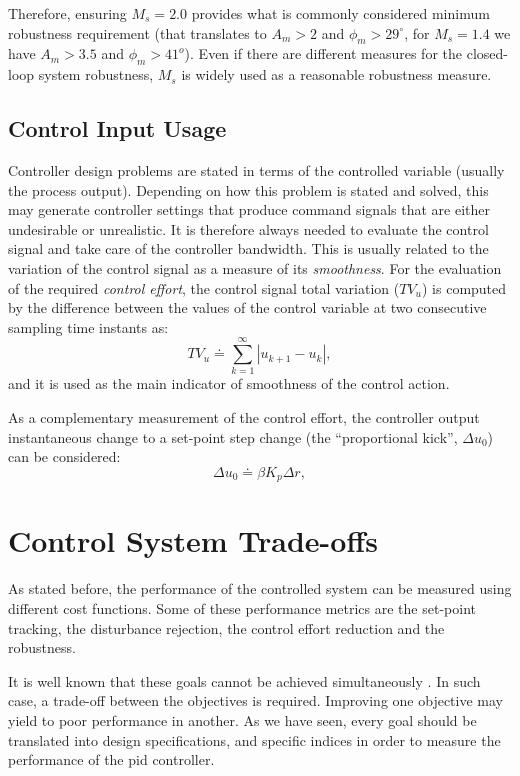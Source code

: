Therefore, ensuring $M_s=2.0$ provides what is commonly considered minimum robustness requirement (that translates to $A_m> 2$ and $\phi_m > 29^\circ$, for $M_s=1.4$  we have $A_m > 3.5$ and $\phi_m > 41^o$). Even if there are different measures for the closed-loop system robustness, $M_s$ is widely used as a reasonable robustness measure.
%
%
\subsection{Control Input Usage}
%
Controller design problems are stated in terms of the controlled variable (usually the process output). Depending on how this problem is stated and solved, this may generate controller settings that produce command signals that are either undesirable or unrealistic. It is therefore always needed to evaluate the control signal and take care of the controller bandwidth. This is usually related to the variation of the control signal as a measure of its \emph{smoothness}. For the evaluation of the required \emph{control effort}, the control signal total variation ($TV_u$) is computed by the difference between the values of the control variable at two consecutive sampling time instants as:
%
\begin{equation}
	TV_u \doteq \sum^{\infty}_{k=1} \left|u_{k+1} - u_k \right|,  \label{eq:p02}
\end{equation}
%
and it is used as the main indicator of smoothness of the control action.

As a complementary measurement of the control effort, the controller output instantaneous change to a set-point step change (the ``proportional kick'', $\Delta u_0$) can be considered:
\begin{equation}
	\Delta u_0 \doteq \beta K_p \Delta r, \label{eq:p02du}
\end{equation}

\section{Control System Trade-offs}
%
As stated before, the performance of the controlled system can be measured using different cost functions. Some of these performance metrics are the set-point tracking, the disturbance rejection, the control effort reduction and the robustness.

It is well known that these goals cannot be achieved simultaneously \citep{Arrieta2010,alcantara2013}. In such case, a trade-off between the objectives is required. Improving one objective may yield to poor performance in another. As we have seen, every goal should be translated into design specifications, and specific indices in order to  measure the performance of the \gls{pid} controller.

